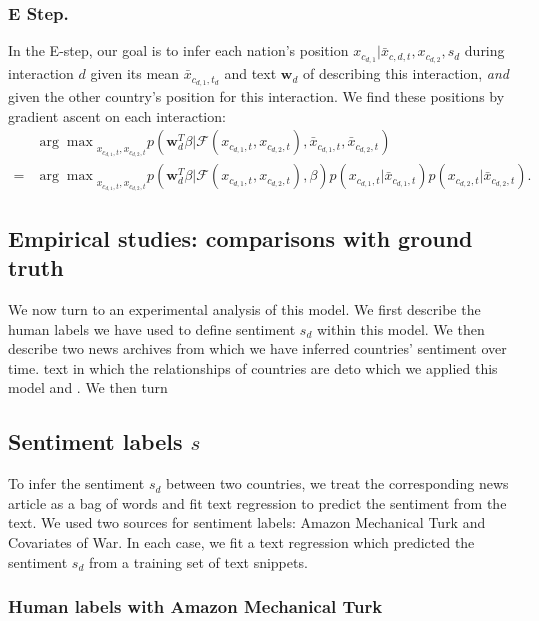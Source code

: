 \subsubsection{E Step.} In the E-step, our goal is to infer each
nation's position $x_{c_{d,1}} | \bar{x}_{c,d,t}, x_{c_{d,2}}, s_d$
during interaction $d$ given its mean $\bar x_{c_{d,1},t_d}$ and text
$\bm w_d$ of describing this interaction, \emph{and} given the other
country's position for this interaction.  We find these positions by
gradient ascent on each interaction:
\begin{align}
  & {\arg \max}_{x_{c_{d,1},t}, x_{c_{d,2},t}}
  p(\bm w_d^T \beta | \mathcal{F}(x_{c_{d,1},t}, x_{c_{d,2},t}),
  \bar x_{c_{d,1},t}, \bar x_{c_{d,2},t}) \\
  = & 
  {\arg \max}_{x_{c_{d,1},t}, x_{c_{d,2},t}}
  p(\bm w_d^T \beta | \mathcal{F}(x_{c_{d,1},t}, x_{c_{d,2},t}), \beta)
  p(x_{c_{d,1},t} | \bar x_{c_{d,1},t})
  p(x_{c_{d,2},t} | \bar x_{c_{d,2},t}).
\end{align}

\subsection{Empirical studies: comparisons with ground truth}
We now turn to an experimental analysis of this model.  We first
describe the human labels we have used to define sentiment $s_d$
within this model.  We then describe two news archives from which we
have inferred countries' sentiment over time. text in which the
relationships of countries are deto which we applied this model and .
We then turn

\subsection{Sentiment labels $s$}
\label{section:sentiment_models}

To infer the sentiment $s_d$ between two countries, we treat the
corresponding news article as a bag of words and fit text regression
\cite{kogan:2009} to predict the sentiment from the text.  We used two
sources for sentiment labels: Amazon Mechanical Turk and Covariates of
War.  In each case, we fit a text regression which predicted the
sentiment $s_d$ from a training set of text snippets.

\subsubsection{Human labels with Amazon Mechanical Turk}
\label{section:mturk}

